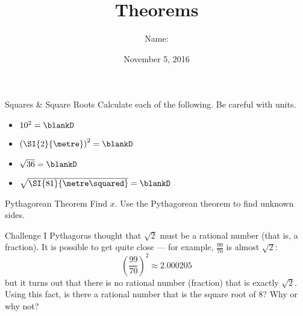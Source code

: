 \documentclass[14pt,letterpaper]{article}
\title{Theorems}
\author{Name: \underline{\hspace{5cm}}}
\date{November 5, 2016}
\begin{document}
\HomeworkTitle

\thispagestyle{empty}

\begin{problem}{Squares \& Square Roots}
  Calculate each of the following. Be careful with units.
  \begin{itemize}
    \item \(10^2 = \blankD\)
    \item \({\left(\SI{2}{\metre}\right)}^2 = \blankD\)
    \item \(\sqrt{36} = \blankD\)
    \item \(\sqrt{\SI{81}{\metre\squared}} = \blankD\)
  \end{itemize}
\end{problem}

\begin{problem}{Pythagorean Theorem}
 Find \(x\). Use the Pythagorean theorem to find unknown sides.

 \begin{center}
 \end{center}
\end{problem}

\begin{problem}{Challenge I}
  Pythagoras thought that \(\sqrt{2}\) must be a rational number (that is, a
  fraction). It is possible to get quite close --- for example,
  \(\frac{99}{70}\) is almost \(\sqrt{2}\): \[
    {\left(\frac{99}{70}\right)}^2 \approx 2.000205
  \] but it turns out that there is no rational number (fraction) that is
  exactly \(\sqrt{2}\). Using this fact, is there a rational number that is the
  square root of \(8\)? Why or why not?
\end{problem}
\end{document}
